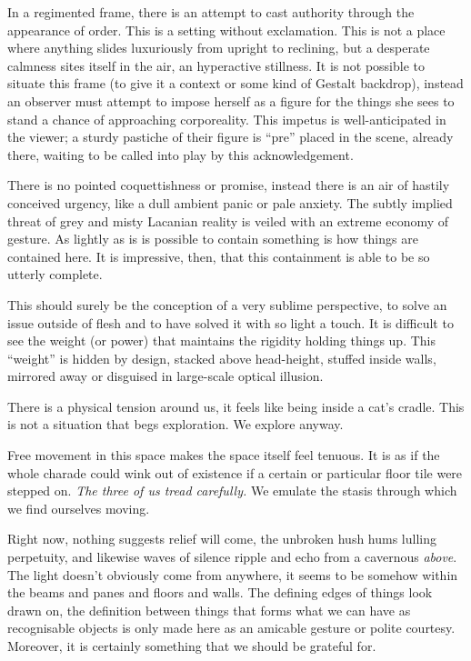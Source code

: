 \documentclass{book}
\begin{document}
In a regimented frame, there is an attempt to cast authority through the
appearance of order. This is a setting without exclamation. This is not a place
where anything slides luxuriously from upright to reclining, but a desperate
calmness sites itself in the air, an hyperactive stillness. It is not possible
to situate this frame (to give it a context or some kind of Gestalt backdrop),
instead an observer must attempt to impose herself as a figure for the things
she sees to stand a chance of approaching corporeality. This impetus is
well-anticipated in the viewer; a sturdy pastiche of their figure is ``pre''
placed in the scene, already there, waiting to be called into play by this
acknowledgement.

There is no pointed coquettishness or promise, instead there is an air of
hastily conceived urgency, like a dull ambient panic or pale anxiety. The
subtly implied threat of grey and misty Lacanian reality is veiled with an
extreme economy of gesture. As lightly as is is possible to contain something
is how things are contained here. It is impressive, then, that this containment
is able to be so utterly complete.

This should surely be the conception of a very sublime perspective, to solve an
issue outside of flesh and to have solved it with so light a touch. It is
difficult to see the weight (or power) that maintains the rigidity holding
things up.  This ``weight'' is hidden by design, stacked above head-height,
stuffed inside walls, mirrored away or disguised in large-scale optical
illusion.

There is a physical tension around us, it feels like being inside a cat's
cradle. This is not a situation that begs exploration. We explore anyway.

Free movement in this space makes the space itself feel tenuous. It is as if
the whole charade could wink out of existence if a certain or particular floor
tile were stepped on.  \emph{The three of us tread carefully.} We emulate the
stasis through which we find ourselves moving.

Right now, nothing suggests relief will come, the unbroken hush hums lulling
perpetuity, and likewise waves of silence ripple and echo from a cavernous
\emph{above}.  The light doesn't obviously come from anywhere, it seems to be
somehow within the beams and panes and floors and walls. The defining edges of
things look drawn on, the definition between things that forms what we can have
as recognisable objects is only made here as an amicable gesture or polite
courtesy. Moreover, it is certainly something that we should be grateful for.
\end{document}
